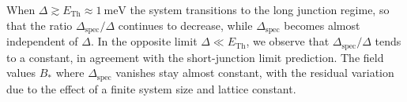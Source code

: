 When $\Delta \gtrsim E_\mathrm{Th}\approx \SI{1}{\meV}$ the system transitions to the long junction regime, so that the ratio $\Delta_\textrm{spec}/\Delta$ continues to decrease, while $\Delta_\text{spec}$ becomes almost independent of $\Delta$.
In the opposite limit $\Delta \ll E_\mathrm{Th}$, we observe that $\Delta_\textrm{spec}/\Delta$ tends to a constant, in agreement with the short-junction limit prediction.
The field values $B_*$ where $\Delta_\textrm{spec}$ vanishes stay almost constant, with the residual variation due to the effect of a finite system size and lattice constant.


